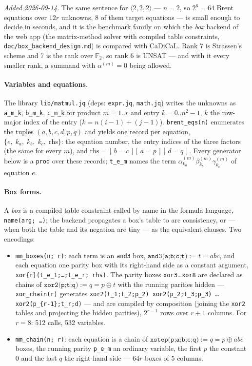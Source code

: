 \documentclass[10pt]{article}
\newcommand{\F}{\mathbb F_2}
\newcommand{\iv}[1]{[\,#1\,]}
\newcommand{\al}[1]{\alpha^{(#1)}}
\newcommand{\be}[1]{\beta^{(#1)}}
\newcommand{\ga}[1]{\gamma^{(#1)}}
\begin{document}
\emph{Added 2026-09-14.} The same sentence for $\langle 2,2,2\rangle$ ---
$n=2$, so $2^6 = 64$ Brent equations over $12r$ unknowns, $8$ of them
target equations --- is small enough to decide in seconds, and it is the
benchmark family on which the \emph{box} backend of the web app (the
matrix-method solver with compiled table constraints,
\texttt{doc/box\_backend\_design.md}) is compared with CaDiCaL. Rank 7 is
Strassen's scheme and 7 is the rank over $\F$, so rank 6 is UNSAT --- and
with it every smaller rank, a summand with $\al{m}=0$ being allowed.

\paragraph{Variables and equations.}
The library \texttt{lib/matmul.jq} (deps: \texttt{expr.jq},
\texttt{math.jq}) writes the unknowns as \texttt{a\_m\_k}, \texttt{b\_m\_k},
\texttt{c\_m\_k} for product $m = 1..r$ and entry $k = 0..n^2-1$, $k$ the
row-major index of the entry ($k = n(i-1) + (j-1)$). \texttt{brent\_eqs(n)}
enumerates the tuples $(a,b,c,d,p,q)$ and yields one record per equation,
$\{e,\;k_a,\;k_b,\;k_c,\;\mathrm{rhs}\}$: the equation number, the entry
indices of the three factors (the same for every $m$), and
$\mathrm{rhs} = \iv{b=c}\iv{a=p}\iv{d=q}$. Every generator below is a
\texttt{prod} over these records; \texttt{t\_e\_m} names the term
$\al{m}_{k_a}\be{m}_{k_b}\ga{m}_{k_c}$ of equation $e$.

\paragraph{Box forms.}
A \emph{box} is a compiled table constraint called by name in the formula
language, \texttt{name(arg;\,\ldots)}; the backend propagates a box's table
to arc consistency, or --- when both the table and its negation are tiny
--- as the equivalent clauses. Two encodings:
\begin{itemize}
\item \texttt{mm\_boxes(n; r)}: each term is an \texttt{and3} box,
  $\texttt{and3(a;b;c;t)} := t = abc$, and each equation one parity box
  with its right-hand side as a constant argument,
  \texttt{xor\{r\}(t\_e\_1;\ldots;t\_e\_r;\,rhs)}. The parity boxes
  \texttt{xor3}\ldots\texttt{xor8} are declared as chains of
  $\texttt{xor2(p;t;q)} := q = p\oplus t$ with the running parities hidden
  --- \texttt{xor\_chain(r)} generates
  \texttt{xor2(t\_1;t\_2;p\_2) xor2(p\_2;t\_3;p\_3) \ldots xor2(p\_\{r-1\};t\_r;d)}
  --- and are compiled by composition (joining the \texttt{xor2} tables and
  projecting the hidden parities), $2^{r-1}$ rows over $r+1$ columns. For
  $r=8$: 512 calls, 532 variables.
\item \texttt{mm\_chain(n; r)}: each equation is a chain of
  $\texttt{xstep(p;a;b;c;q)} := q = p \oplus abc$ boxes, the running parity
  \texttt{p\_e\_m} an ordinary variable, the first $p$ the constant 0 and
  the last $q$ the right-hand side --- $64r$ boxes of 5 columns.
\end{itemize}
\end{document}
